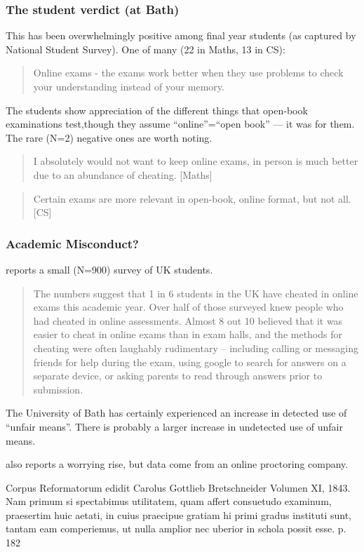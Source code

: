 \begin{frame}[fragile]
\frametitle{The student verdict (at Bath)}
This has been overwhelmingly positive among final year students (as captured by National Student Survey). One of many (22 in Maths, 13 in CS): 
\pause
\begin{quote}
Online exams - the exams work better when they use problems to check your understanding instead of your memory.
\end{quote}
\pause
The students show appreciation of the different things that open-book examinations test,though they assume ``online''=``open book'' --- it was for them. \pause 
The rare (N=2) negative ones are worth noting.
\pause
\begin{quote}
I absolutely would not want to keep online exams, in person is much better due to an abundance of cheating. [Maths]
\end{quote}
\pause
\begin{quote}
Certain exams are more relevant in open-book, online format, but not all. [CS]
\end{quote}
\end{frame}
\begin{frame}[fragile]
\frametitle{Academic Misconduct?}
\cite{Dickinson2022a} reports a small (N=900) survey \cite{AcademicAppeals2022a}  of UK students. 
\pause
\begin{quote}
The numbers suggest that 1 in 6 students in the UK have cheated in online exams this academic year. Over half of those surveyed knew people who had cheated in online assessments. Almost 8 out 10 believed that it was easier to cheat in online exams than in exam halls, and the methods for cheating were often laughably rudimentary – including calling or messaging friends for help during the exam, using google to search for answers on a separate device, or asking parents to read through answers prior to submission.
\end{quote}
\pause
The University of Bath has certainly experienced an increase in detected use of ``unfair means''. There is probably a larger increase in undetected use of unfair means.
\pause\par
\cite{Williams2022a} also reports a worrying rise, but data come from an online proctoring company.
\end{frame}
\iffalse
Corpus Reformatorum edidit Carolus Gottlieb Bretschneider Volumen XI, 1843.
Nam primum si spectabimus utilitatem, quam affert consuetudo examinum, praesertim huic aetati, in cuius praecipue gratiam hi primi gradus instituti sunt, tantam eam comperiemus, ut nulla amplior nec uberior in schola possit esse. p. 182
